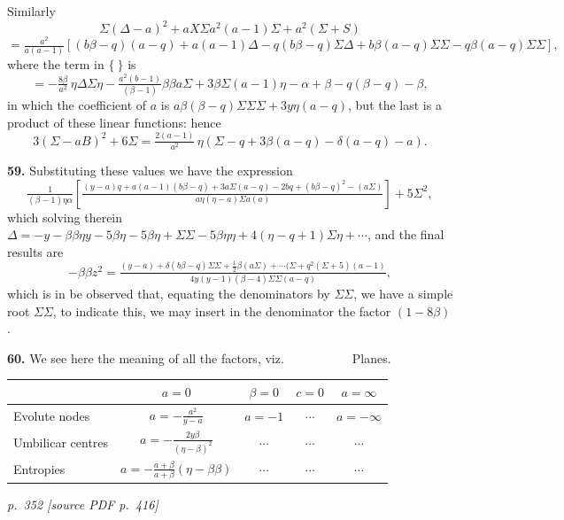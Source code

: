 \documentclass[11pt,a4paper]{article}
\newcommand{\pagemarker}[2]{\par\bigskip\noindent\textit{p.~#1 [source PDF p.~#2]}\par\smallskip}
\begin{document}
Similarly
\[
\Sigma(\Delta - a)^2 + aX\Sigma a^2(a - 1)\Sigma + a^2(\Sigma + S)
\]
\[
= \tfrac{a^2}{a(a - 1)}\!\left[(b\beta - q)(a - q) + a(a - 1)\Delta - q(b\beta - q)\Sigma\Delta + b\beta(a - q)\Sigma\Sigma - q\beta(a - q)\Sigma\Sigma\right],
\]
where the term in $\{\ \}$ is
\[
= -\tfrac{8\beta}{a^2}\,\eta\Delta\Sigma\eta - \tfrac{a^2(b - 1)}{(\beta - 1)}\beta\beta a\Sigma + 3\beta\Sigma(a - 1)\eta - \alpha + \beta - q(\beta - q) - \beta,
\]
in which the coefficient of $a$ is $a\beta(\beta - q)\Sigma\Sigma\Sigma + 3y\eta(a - q)$, but the last is a product of these linear functions: hence
\[
3(\Sigma - aB)^2 + 6\Sigma = \tfrac{2(a - 1)}{a^2}\,\eta(\Sigma - q + 3\beta(a - q) - \delta(a - q) - a).
\]

\textbf{59.} Substituting these values we have the expression
\[
\tfrac{1}{(\beta - 1)\eta\alpha}\!\left[\tfrac{(y - a)q + a(a - 1)(b\beta - q) + 3a\Sigma(a - q) - 2bq + (b\beta - q)^2 - (a\Sigma)}{a\eta(\eta - a)\Sigma a(a)}\right] + 5\Sigma^2,
\]
which solving therein $\Delta = -y - \beta\beta\eta y - 5\beta\eta - 5\beta\eta + \Sigma\Sigma - 5\beta\eta\eta + 4(\eta - q + 1)\Sigma\eta + \cdots$, and the final results are
\[
-\beta\beta z^2 = \tfrac{(y - a)+ \delta(b\beta - q)\Sigma\Sigma + \tfrac{1}{2}\beta(a\Sigma) + \cdots(\Sigma + q^2(\Sigma + 5)(a - 1)}{4y(y - 1)(\beta - 4)\Sigma\Sigma(a - q)},
\]
which is in be observed that, equating the denominators by $\Sigma\Sigma$, we have a simple root $\Sigma\Sigma$, to indicate this, we may insert in the denominator the factor $(1 - 8\beta)$.

\textbf{60.} We see here the meaning of all the factors, viz.\ \ \ \ \ \ \ \ \ \ \ Planes.
\begin{center}
\begin{tabular}{l|cccc}
 & $a = 0$ & $\beta = 0$ & $c = 0$ & $a = \infty$\\
\hline
Evolute nodes & $a = -\tfrac{a^2}{y - a}$ & $a = -1$ & $\cdots$ & $a = -\infty$\\
Umbilicar centres & $a = -\tfrac{2y\beta}{(\eta - \beta)^2}$ & $\cdots$ & $\cdots$ & $\cdots$\\
Entropies & $a = -\tfrac{a + \beta}{a + \beta}(\eta - \beta\beta)$ & $\cdots$ & $\cdots$ & $\cdots$\\
\end{tabular}
\end{center}

\clearpage

\bigskip
\pagemarker{352}{416}
\smallskip
\end{document}
